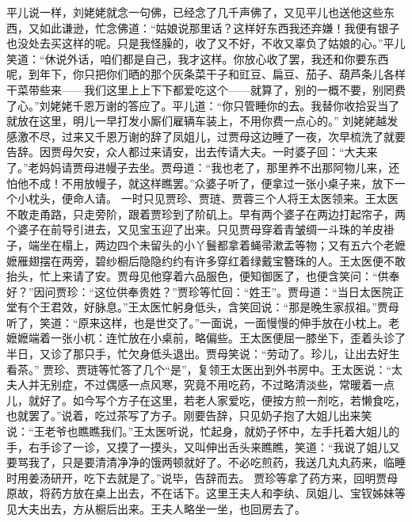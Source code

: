 \documentclass[12pt,oneside]{book}
\begin{document}
平儿说一样，刘姥姥就念一句佛，已经念了几千声佛了，又见平儿也送他这些东西，又如此谦逊，忙念佛道：“姑娘说那里话？这样好东西我还弃嫌！我便有银子也没处去买这样的呢。只是我怪臊的，收了又不好，不收又辜负了姑娘的心。”平儿笑道：“休说外话，咱们都是自己，我才这样。你放心收了罢，我还和你要东西呢，到年下，你只把你们晒的那个灰条菜干子和豇豆、扁豆、茄子、葫芦条儿各样干菜带些来——我们这里上上下下都爱吃这个——就算了，别的一概不要，别罔费了心。”刘姥姥千恩万谢的答应了。平儿道：“你只管睡你的去。我替你收拾妥当了就放在这里，明儿一早打发小厮们雇辆车装上，不用你费一点心的。”
刘姥姥越发感激不尽，过来又千恩万谢的辞了凤姐儿，过贾母这边睡了一夜，次早梳洗了就要告辞。因贾母欠安，众人都过来请安，出去传请大夫。一时婆子回：“大夫来了。”老妈妈请贾母进幔子去坐。贾母道：“我也老了，那里养不出那阿物儿来，还怕他不成！不用放幔子，就这样瞧罢。”众婆子听了，便拿过一张小桌子来，放下一个小枕头，便命人请。
一时只见贾珍、贾琏、贾蓉三个人将王太医领来。王太医不敢走甬路，只走旁阶，跟着贾珍到了阶矶上。早有两个婆子在两边打起帘子，两个婆子在前导引进去，又见宝玉迎了出来。只见贾母穿着青皱绸一斗珠的羊皮褂子，端坐在榻上，两边四个未留头的小丫鬟都拿着蝇帚漱盂等物；又有五六个老嬷嬷雁翅摆在两旁，碧纱橱后隐隐约约有许多穿红着绿戴宝簪珠的人。王太医便不敢抬头，忙上来请了安。贾母见他穿着六品服色，便知御医了，也便含笑问：“供奉好？”因问贾珍：“这位供奉贵姓？”贾珍等忙回：“姓王”。贾母道：“当日太医院正堂有个王君效，好脉息。”王太医忙躬身低头，含笑回说：“那是晚生家叔祖。”贾母听了，笑道：“原来这样，也是世交了。”一面说，一面慢慢的伸手放在小枕上。老嬷嬷端着一张小杌：连忙放在小桌前，略偏些。王太医便屈一膝坐下，歪着头诊了半日，又诊了那只手，忙欠身低头退出。贾母笑说：“劳动了。珍儿，让出去好生看茶。”
贾珍、贾琏等忙答了几个“是”，复领王太医出到外书房中。王太医说：“太夫人并无别症，不过偶感一点风寒，究竟不用吃药，不过略清淡些，常暖着一点儿，就好了。如今写个方子在这里，若老人家爱吃，便按方煎一剂吃，若懒食吃，也就罢了。”说着，吃过茶写了方子。刚要告辞，只见奶子抱了大姐儿出来笑说：“王老爷也瞧瞧我们。”王太医听说，忙起身，就奶子怀中，左手托着大姐儿的手，右手诊了一诊，又摸了一摸头，又叫伸出舌头来瞧瞧，笑道：“我说了姐儿又要骂我了，只是要清清净净的饿两顿就好了。不必吃煎药，我送几丸丸药来，临睡时用姜汤研开，吃下去就是了。”说毕，告辞而去。
贾珍等拿了药方来，回明贾母原故，将药方放在桌上出去，不在话下。这里王夫人和李纨、凤姐儿、宝钗姊妹等见大夫出去，方从橱后出来。王夫人略坐一坐，也回房去了。
\end{document}
